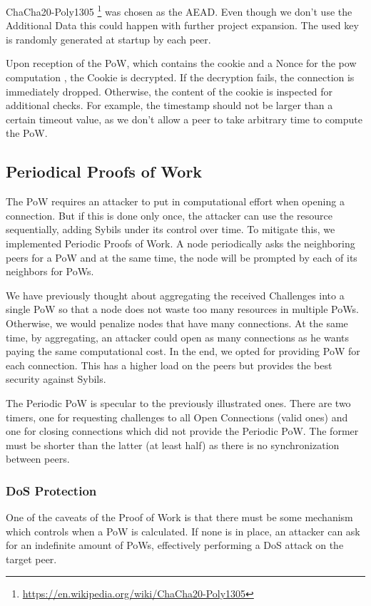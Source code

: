 \documentclass[a4paper,english,10pt,NET]{tumarticle}
\begin{document}
ChaCha20-Poly1305 \footnote{\url{https://en.wikipedia.org/wiki/ChaCha20-Poly1305}} was chosen as the AEAD. Even though we don't use the Additional Data this could happen with further project expansion. The used key is randomly generated at startup by each peer.

Upon reception of the PoW, which contains the cookie and a Nonce for the pow computation \label{tab:pow}, the Cookie is decrypted. If the decryption fails, the connection is immediately dropped. Otherwise, the content of the cookie is inspected for additional checks. For example, the timestamp should not be larger than a certain timeout value, as we don't allow a peer to take arbitrary time to compute the PoW.

\subsection{Periodical Proofs of Work}

The PoW requires an attacker to put in computational effort when opening a connection. But if this is done only once, the attacker can use the resource sequentially, adding Sybils under its control over time. To mitigate this, we implemented Periodic Proofs of Work. A node periodically asks the neighboring peers for a PoW and at the same time, the node will be prompted by each of its neighbors for PoWs. 

We have previously thought about aggregating the received Challenges into a single PoW so that a node does not waste too many resources in multiple PoWs. Otherwise, we would penalize nodes that have many connections. At the same time, by aggregating, an attacker could open as many connections as he wants paying the same computational cost. In the end, we opted for providing PoW for each connection. This has a higher load on the peers but provides the best security against Sybils.

The Periodic PoW is specular to the previously illustrated ones. There are two timers, one for requesting challenges to all Open Connections (valid ones) and one for closing connections which did not provide the Periodic PoW. The former must be shorter than the latter (at least half) as there is no synchronization between peers.  

\subsubsection{DoS Protection}

One of the caveats of the Proof of Work is that there must be some mechanism which controls when a PoW is calculated. If none is in place, an attacker can ask for an indefinite amount of PoWs, effectively performing a DoS attack on the target peer. 
\end{document}
